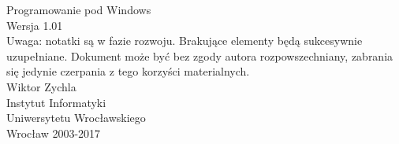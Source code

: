 ﻿\begin{titlepage}
\begin{center}
\textsf{
\Huge Programowanie pod Windows\\
\vspace*{1.5cm}
\small Wersja 1.01\\
Uwaga: notatki są w fazie rozwoju. Brakujące elementy będą sukcesywnie uzupełniane. 
Dokument może być bez zgody autora rozpowszechniany, zabrania się jedynie czerpania z tego 
korzyści materialnych.\\
\vspace*{4.5cm}
\Large Wiktor Zychla\\
\vspace{1.5cm}
\Large
Instytut Informatyki\\Uniwersytetu Wrocławskiego\\
\vfill
Wrocław 2003-2017}
\end{center}
\end{titlepage}
